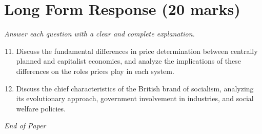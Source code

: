 \documentclass[12pt]{article}
\begin{document}
\section*{Long Form Response (20 marks)}
\textit{Answer each question with a clear and complete explanation.}
\begin{enumerate}[label=\arabic*.]
\setcounter{enumi}{10}
\item Discuss the fundamental differences in price determination between centrally planned and capitalist economies, and analyze the implications of these differences on the roles prices play in each system.
\item Discuss the chief characteristics of the British brand of socialism, analyzing its evolutionary approach, government involvement in industries, and social welfare policies.
\end{enumerate}

\vfill
\noindent\textit{End of Paper}
\end{document}
